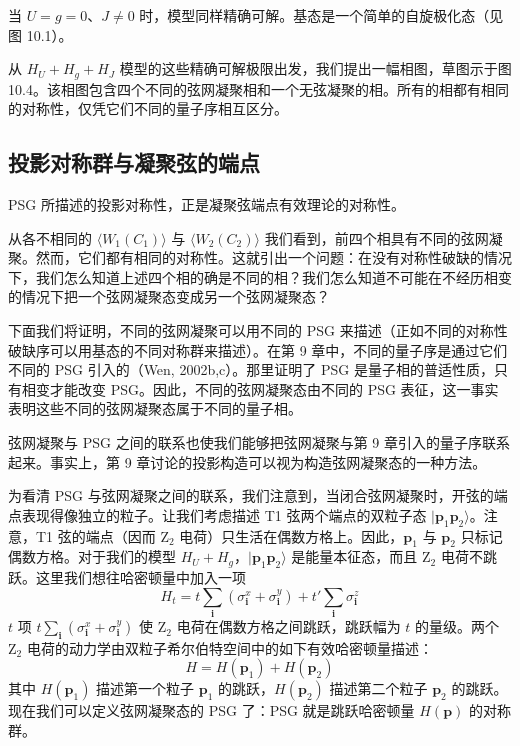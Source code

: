 当 $U=g=0$、$J\neq0$ 时，模型同样精确可解。基态是一个简单的自旋极化态（见图 10.1）。

从 $H_U+H_g+H_J$ 模型的这些精确可解极限出发，我们提出一幅相图，草图示于图 10.4。该相图包含四个不同的弦网凝聚相和一个无弦凝聚的相。所有的相都有相同的对称性，仅凭它们不同的量子序相互区分。

\subsection{投影对称群与凝聚弦的端点}

\begin{keypoints}\item PSG 所描述的投影对称性，正是凝聚弦端点有效理论的对称性。\end{keypoints}

从各不相同的 $\langle W_1(C_1)\rangle$ 与 $\langle W_2(C_2)\rangle$ 我们看到，前四个相具有不同的弦网凝聚。然而，它们都有相同的对称性。这就引出一个问题：在没有对称性破缺的情况下，我们怎么知道上述四个相的确是不同的相？我们怎么知道不可能在不经历相变的情况下把一个弦网凝聚态变成另一个弦网凝聚态？


下面我们将证明，不同的弦网凝聚可以用不同的 PSG 来描述（正如不同的对称性破缺序可以用基态的不同对称群来描述）。在第 9 章中，不同的量子序是通过它们不同的 PSG 引入的（Wen, 2002b,c）。那里证明了 PSG 是量子相的普适性质，只有相变才能改变 PSG。因此，不同的弦网凝聚态由不同的 PSG 表征，这一事实表明这些不同的弦网凝聚态属于不同的量子相。

弦网凝聚与 PSG 之间的联系也使我们能够把弦网凝聚与第 9 章引入的量子序联系起来。事实上，第 9 章讨论的投影构造可以视为构造弦网凝聚态的一种方法。

为看清 PSG 与弦网凝聚之间的联系，我们注意到，当闭合弦网凝聚时，开弦的端点表现得像独立的粒子。让我们考虑描述 T1 弦两个端点的双粒子态 $|\pmb{p}_1\pmb{p}_2\rangle$。注意，T1 弦的端点（因而 Z$_2$ 电荷）只生活在偶数方格上。因此，$\pmb{p}_1$ 与 $\pmb{p}_2$ 只标记偶数方格。对于我们的模型 $H_U+H_g$，$|\pmb{p}_1\pmb{p}_2\rangle$ 是能量本征态，而且 Z$_2$ 电荷不跳跃。这里我们想往哈密顿量中加入一项
\begin{equation*}
H_t=t\sum_{\pmb{i}}(\sigma_{\pmb{i}}^{x}+\sigma_{\pmb{i}}^{y})+t'\sum_{\pmb{i}}\sigma_{\pmb{i}}^{z}
\end{equation*}
$t$ 项 $t\sum_{\pmb{i}}(\sigma_{\pmb{i}}^{x}+\sigma_{\pmb{i}}^{y})$ 使 Z$_2$ 电荷在偶数方格之间跳跃，跳跃幅为 $t$ 的量级。两个 Z$_2$ 电荷的动力学由双粒子希尔伯特空间中的如下有效哈密顿量描述：
\begin{equation*}
H=H(\pmb{p}_1)+H(\pmb{p}_2)
\end{equation*}
其中 $H(\pmb{p}_1)$ 描述第一个粒子 $\pmb{p}_1$ 的跳跃，$H(\pmb{p}_2)$ 描述第二个粒子 $\pmb{p}_2$ 的跳跃。现在我们可以定义弦网凝聚态的 PSG 了：PSG 就是跳跃哈密顿量 $H(\pmb{p})$ 的对称群。

